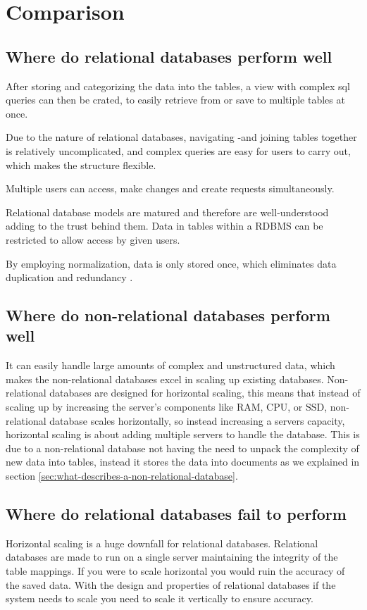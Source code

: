 \section{Comparison}

\subsection{Where do relational databases perform well}
After storing and categorizing the data into the tables, a view with complex sql queries can then be crated, to easily retrieve from or save to multiple tables at once.

Due to the nature of relational databases, navigating -and joining tables together is relatively uncomplicated, and complex queries are easy for users to carry out, which makes the structure flexible.

Multiple users can access, make changes and create requests simultaneously.

Relational database models are matured and therefore are well-understood adding to the trust behind them. Data in tables within a RDBMS can be restricted to allow access by given users.

By employing normalization, data is only stored once, which eliminates data duplication and redundancy \parencite{microsoft-normaliziation}.

\subsection{Where do non-relational databases perform well}
It can easily handle large amounts of complex and unstructured data, which makes the non-relational databases excel in scaling up existing databases.
Non-relational databases are designed for horizontal scaling, this means that instead of scaling up by increasing the server's components like RAM, CPU, or SSD, non-relational database scales horizontally, so instead increasing a servers capacity, horizontal scaling is about adding multiple servers to handle the database. \parencite{mongodb-advantages-of-nosql}
This is due to a non-relational database not having the need to unpack the complexity of new data into tables, instead it stores the data into documents as we explained in section \ref{sec:what-describes-a-non-relational-database}.


\subsection{Where do relational databases fail to perform}
Horizontal scaling is a huge downfall for relational databases. Relational databases are made to run on a single server maintaining the integrity of the table mappings. If you were to scale horizontal you would ruin the accuracy of the saved data.
With the design and properties of relational databases if the system needs to scale you need to scale it vertically to ensure accuracy. \parencite{loginradius-rdbms-vs-nosql}

